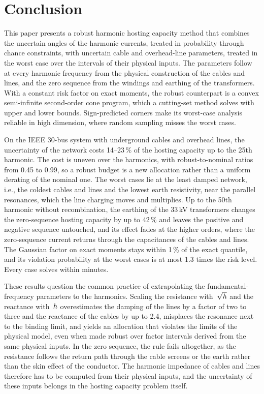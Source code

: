 \section{Conclusion}
\label{sec:conclusion}

This paper presents a robust harmonic hosting capacity method that combines the uncertain angles of the harmonic currents, treated in probability through chance constraints, with uncertain cable and overhead-line parameters, treated in the worst case over the intervals of their physical inputs. The parameters follow at every harmonic frequency from the physical construction of the cables and lines, and the zero sequence from the windings and earthing of the transformers. With a constant risk factor on exact moments, the robust counterpart is a convex semi-infinite second-order cone program, which a cutting-set method solves with upper and lower bounds. Sign-predicted corners make its worst-case analysis reliable in high dimension, where random sampling misses the worst cases.

On the IEEE 30-bus system with underground cables and overhead lines, the uncertainty of the network costs 14--23\,\% of the hosting capacity up to the 25th harmonic. The cost is uneven over the harmonics, with robust-to-nominal ratios from 0.45 to 0.99, so a robust budget is a new allocation rather than a uniform derating of the nominal one. The worst cases lie at the least damped network, i.e., the coldest cables and lines and the lowest earth resistivity, near the parallel resonances, which the line charging moves and multiplies. Up to the 50th harmonic without recombination, the earthing of the 33\,kV transformers changes the zero-sequence hosting capacity by up to 42\,\% and leaves the positive and negative sequence untouched, and its effect fades at the higher orders, where the zero-sequence current returns through the capacitances of the cables and lines. The Gaussian factor on exact moments stays within 1\,\% of the exact quantile, and its violation probability at the worst cases is at most 1.3 times the risk level. Every case solves within minutes.

These results question the common practice of extrapolating the fundamental-frequency parameters to the harmonics. Scaling the resistance with~$\sqrt{h}$ and the reactance with~$h$ overestimates the damping of the lines by a factor of two to three and the reactance of the cables by up to 2.4, misplaces the resonance next to the binding limit, and yields an allocation that violates the limits of the physical model, even when made robust over factor intervals derived from the same physical inputs. In the zero sequence, the rule fails altogether, as the resistance follows the return path through the cable screens or the earth rather than the skin effect of the conductor. The harmonic impedance of cables and lines therefore has to be computed from their physical inputs, and the uncertainty of these inputs belongs in the hosting capacity problem itself.